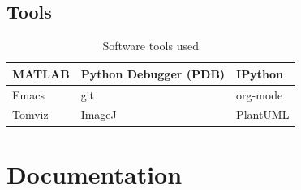 \documentclass[11pt]{report}
\begin{document}
\subsection{Tools}
\label{sec:orgf8db663}
\begin{table}[htbp]
\caption{\label{tab:orgb05e520}
Software tools used}
\centering
\begin{tabularx}{\textwidth}{|X|X|X|}
\hline
MATLAB & Python Debugger (PDB) & IPython\\
\hline
Emacs & git & org-mode\\
\hline
Tomviz & ImageJ & PlantUML\\
\hline
\end{tabularx}
\end{table}

\section{Documentation}
\label{sec:org5e53c90}
\clearpage










\end{document}
